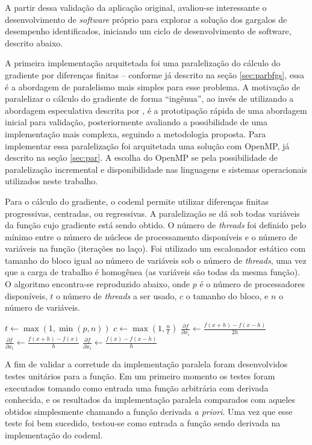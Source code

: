 \documentclass[cic,tc]{iiufrgs}
\begin{document}
A partir dessa validação da aplicação original, avaliou-se interessante o
desenvolvimento de \textit{software} próprio para explorar a solução dos
gargalos de desempenho identificados, iniciando um ciclo de desenvolvimento de
software, descrito abaixo.

A primeira implementação arquitetada foi uma paralelização do cálculo do
gradiente por diferenças finitas -- conforme já descrito na seção
\ref{sec:parbfgs}, essa é a abordagem de paralelismo mais simples para esse
problema. A motivação de paralelizar o cálculo do gradiente de forma
``ingênua'', ao invés de utilizando a abordagem especulativa descrita por
\cite{byrd1988parallel}, é a prototipação rápida de uma abordagem inicial para
validação, posteriormente avaliando a possibilidade de uma implementação mais
complexa, seguindo a metodologia proposta. Para implementar essa paralelização
foi arquitetada uma solução com OpenMP, já descrito na seção \ref{sec:par}. A
escolha do OpenMP se pela possibilidade de paralelização incremental e
disponibilidade nas linguagens e sistemas operacionais utilizados neste
trabalho.

Para o cálculo do gradiente, o codeml permite utilizar diferenças finitas
progressivas, centradas, ou regressivas. A paralelização se dá sob todas
variáveis da função cujo gradiente está sendo obtido. O número de
\textit{threads} foi definido pelo mínimo entre o número de núcleos de
processamento disponíveis e o número de variáveis na função (iterações no
laço). Foi utilizado um escalonador estático com tamanho do bloco igual ao
número de variáveis sob o número de \textit{threads}, uma vez que a carga de
trabalho é homogênea (as variáveis são todas da mesma função). O algoritmo
encontra-se reproduzido abaixo, onde $p$ é o número de processadores
disponíveis, $t$ o número de \textit{threads} a ser usado, $c$ o tamanho do
bloco, e $n$ o número de variáveis.

\begin{algorithmic}
\State $t \gets \max(1, \min(p, n))$
\State $c \gets \max(1, \frac{n}{t})$
    \State $\frac{\partial f}{\partial x_i} \gets \frac{f(x+h)-f(x-h)}{2h}$
    \State $\frac{\partial f}{\partial x_i} \gets \frac{f(x+h)-f(x)}{h}$
  \Else
    \State $\frac{\partial f}{\partial x_i} \gets \frac{f(x)-f(x-h)}{h}$
  \EndIf
\EndFor
\end{algorithmic}

A fim de validar a corretude da implementação paralela foram desenvolvidos
testes unitários para a função. Em um primeiro momento os testes foram
executados tomando como entrada uma função arbitrária com derivada conhecida,
e os resultados da implementação paralela comparados com aqueles obtidos
simplesmente chamando a função derivada \textit{a priori}. Uma vez que esse
teste foi bem sucedido, testou-se como entrada a função sendo derivada na
implementação do codeml.
\end{document}
